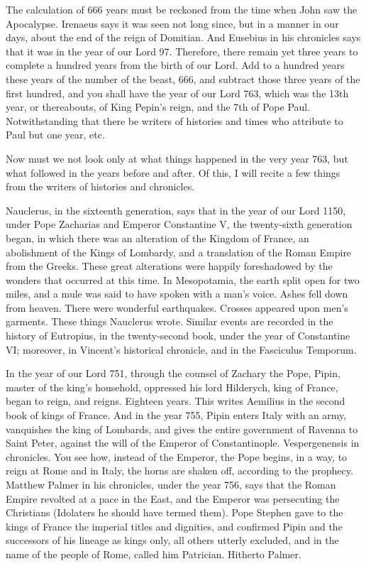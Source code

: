 The calculation of 666 years must be reckoned from the time when John saw the Apocalypse. Irenaeus says it was seen not long since, but in a manner in our days, about the end of the reign of Domitian. And Eusebius in his chronicles says that it was in the year of our Lord 97. Therefore, there remain yet three years to complete a hundred years from the birth of our Lord. Add to a hundred years these years of the number of the beast, 666, and subtract those three years of the first hundred, and you shall have the year of our Lord 763, which was the 13th year, or thereabouts, of King Pepin’s reign, and the 7th of Pope Paul. Notwithstanding that there be writers of histories and times who attribute to Paul but one year, etc.

Now must we not look only at what things happened in the very year 763, but what followed in the years before and after. Of this, I will recite a few things from the writers of histories and chronicles.

Nauclerus, in the sixteenth generation, says that in the year of our Lord 1150, under Pope Zacharias and Emperor Constantine V, the twenty-sixth generation began, in which there was an alteration of the Kingdom of France, an abolishment of the Kings of Lombardy, and a translation of the Roman Empire from the Greeks. These great alterations were happily foreshadowed by the wonders that occurred at this time. In Mesopotamia, the earth split open for two miles, and a mule was said to have spoken with a man’s voice. Ashes fell down from heaven. There were wonderful earthquakes. Crosses appeared upon men’s garments. These things Nauclerus wrote. Similar events are recorded in the history of Eutropius, in the twenty-second book, under the year of Constantine VI; moreover, in Vincent’s historical chronicle, and in the Fasciculus Temporum.

In the year of our Lord 751, through the counsel of Zachary the Pope, Pipin, master of the king’s household, oppressed his lord Hilderych, king of France, began to reign, and reigns. Eighteen years. This writes Aemilius in the second book of kings of France. And in the year 755, Pipin enters Italy with an army, vanquishes the king of Lombards, and gives the entire government of Ravenna to Saint Peter, against the will of the Emperor of Constantinople. Vespergenensis in chronicles. You see how, instead of the Emperor, the Pope begins, in a way, to reign at Rome and in Italy, the horns are shaken off, according to the prophecy. Matthew Palmer in his chronicles, under the year 756, says that the Roman Empire revolted at a pace in the East, and the Emperor was persecuting the Christians (Idolaters he should have termed them). Pope Stephen gave to the kings of France the imperial titles and dignities, and confirmed Pipin and the successors of his lineage as kings only, all others utterly excluded, and in the name of the people of Rome, called him Patrician. Hitherto Palmer.

